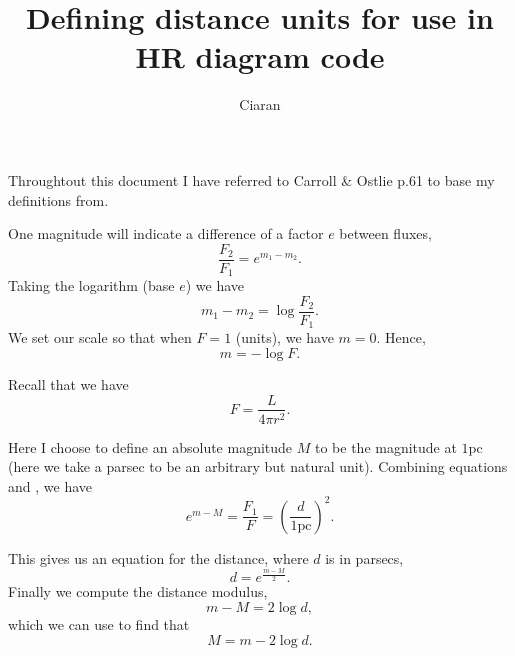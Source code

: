 \documentclass[]{article}
\author{Ciaran}
\title{Defining distance units for use in HR diagram code}
\begin{document}
\maketitle

Throughtout this document I have referred to Carroll \& Ostlie p.61 to base my definitions from. 

One magnitude will indicate a difference of a factor \(e\) between fluxes,
\begin{equation}
    \frac{F_2}{F_1} = e^{m_1-m_2}. \label{eqn:flux ratio}
\end{equation}
Taking the logarithm (base \(e\)) we have 
\begin{equation}
    m_1-m_2 = \log \frac{F_2}{F_1}. \label{eqn:log flux ratio}
\end{equation}
We set our scale so that when $F=1$ (units), we have \(m = 0\).
Hence,
\begin{equation}
    m = - \log F . \label{eqn:log flux}
\end{equation}

Recall that we have
\begin{equation}
    F = \frac{L}{4\pi r^2}. \label{eqn:flux}
\end{equation}

Here I choose to define an absolute magnitude $M$ to be the magnitude at $1 \text{pc}$ (here we take a parsec to be an arbitrary but natural unit).
Combining equations  and , we have
\begin{equation}
    e^{m-M} = \frac{F_1}{F} = {\left(\frac{d}{1\text{pc}}\right)}^2.  
\end{equation}

This gives us an equation for the distance, where \(d\) is in parsecs,
\begin{equation}
    d = e^{\frac{m-M}{2}}.
\end{equation}
Finally we compute the distance modulus,
\begin{equation}
    m-M = 2 \log d,
\end{equation}
which we can use to find that 
\begin{equation}
    M = m - 2 \log d.
\end{equation}
\end{document}
